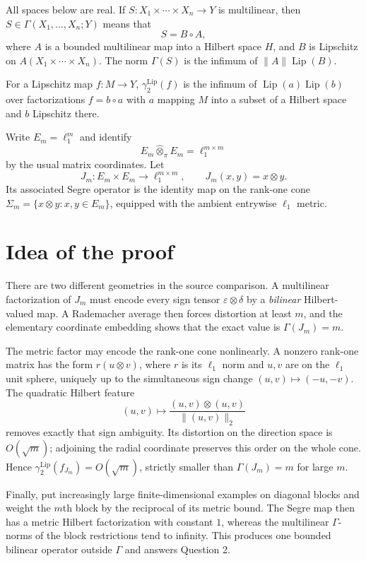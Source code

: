 \documentclass[11pt]{article}
\newcommand{\Lip}{\operatorname{Lip}}
\newcommand{\G}{\Gamma}
\newcommand{\gLip}{\gamma^{\mathrm{Lip}}_2}
\newcommand{\Sig}{\Sigma}
\begin{document}
All spaces below are real.  If $S:X_1\times\cdots\times X_n\to Y$ is
multilinear, then $S\in\G(X_1,\ldots,X_n;Y)$ means that
\[
 S=B\circ A,
\]
where $A$ is a bounded multilinear map into a Hilbert space $H$, and $B$ is
Lipschitz on $A(X_1\times\cdots\times X_n)$.  The norm $\G(S)$ is the
infimum of $\|A\|\Lip(B)$.

For a Lipschitz map $f:M\to Y$, $\gLip(f)$ is the infimum of
$\Lip(a)\Lip(b)$ over factorizations $f=b\circ a$ with $a$ mapping $M$
into a subset of a Hilbert space and $b$ Lipschitz there.

Write $E_m=\ell_1^m$ and identify
\[
 E_m\widehat\otimes_\pi E_m=\ell_1^{m\times m}
\]
by the usual matrix coordinates.  Let
\[
 J_m:E_m\times E_m\longrightarrow \ell_1^{m\times m},
 \qquad J_m(x,y)=x\otimes y.
\]
Its associated Segre operator is the identity map on the rank-one cone
$\Sig_m=\{x\otimes y:x,y\in E_m\}$, equipped with the ambient entrywise
$\ell_1$ metric.

\section{Idea of the proof}

There are two different geometries in the source comparison.  A multilinear
factorization of $J_m$ must encode every sign tensor
$\varepsilon\otimes\delta$ by a \emph{bilinear} Hilbert-valued map.  A
Rademacher average then forces distortion at least $m$, and the elementary
coordinate embedding shows that the exact value is $\G(J_m)=m$.

The metric factor may encode the rank-one cone nonlinearly.  A nonzero
rank-one matrix has the form $r(u\otimes v)$, where $r$ is its $\ell_1$ norm
and $u,v$ are on the $\ell_1$ unit sphere, uniquely up to the simultaneous
sign change $(u,v)\mapsto(-u,-v)$.  The quadratic Hilbert feature
\[
 (u,v)\longmapsto
 \frac{(u,v)\otimes(u,v)}{\|(u,v)\|_2}
\]
removes exactly that sign ambiguity.  Its distortion on the direction space
is $O(\sqrt m)$; adjoining the radial coordinate preserves this order on the
whole cone.  Hence $\gLip(f_{J_m})=O(\sqrt m)$, strictly smaller than
$\G(J_m)=m$ for large $m$.

Finally, put increasingly large finite-dimensional examples on diagonal
blocks and weight the $m$th block by the reciprocal of its metric bound.  The
Segre map then has a metric Hilbert factorization with constant $1$, whereas
the multilinear $\G$-norms of the block restrictions tend to infinity.  This
produces one bounded bilinear operator outside $\G$ and answers Question 2.
\end{document}
